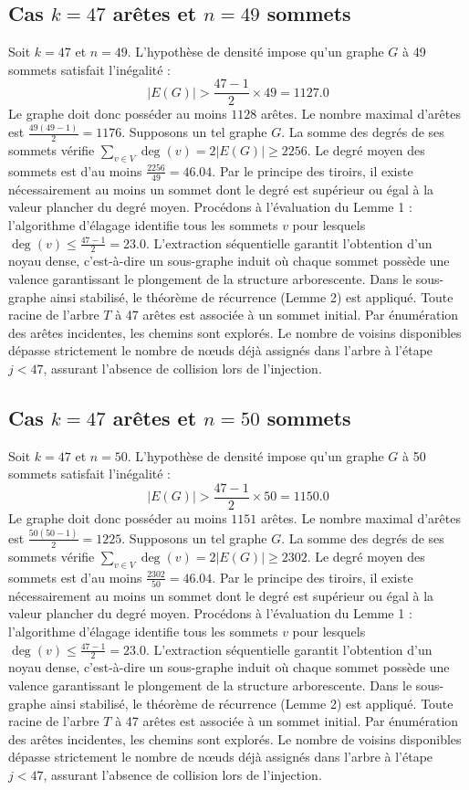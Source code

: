 \documentclass[12pt,a4paper]{article}
\begin{document}
\subsection{Cas $k = 47$ arêtes et $n = 49$ sommets}
Soit $k = 47$ et $n = 49$. L'hypothèse de densité impose qu'un graphe $G$ à 49 sommets satisfait l'inégalité :
$$ |E(G)| > \frac{47-1}{2} \times 49 = 1127.0 $$
Le graphe doit donc posséder au moins $1128$ arêtes. Le nombre maximal d'arêtes est $\frac{49(49-1)}{2} = 1176$.
Supposons un tel graphe $G$. La somme des degrés de ses sommets vérifie $\sum_{v \in V} \deg(v) = 2|E(G)| \geq 2256$.
Le degré moyen des sommets est d'au moins $\frac{2256}{49} = 46.04$.
Par le principe des tiroirs, il existe nécessairement au moins un sommet dont le degré est supérieur ou égal à la valeur plancher du degré moyen.
Procédons à l'évaluation du Lemme 1 : l'algorithme d'élagage identifie tous les sommets $v$ pour lesquels $\deg(v) \leq \frac{47-1}{2} = 23.0$.
L'extraction séquentielle garantit l'obtention d'un noyau dense, c'est-à-dire un sous-graphe induit où chaque sommet possède une valence garantissant le plongement de la structure arborescente.
Dans le sous-graphe ainsi stabilisé, le théorème de récurrence (Lemme 2) est appliqué. Toute racine de l'arbre $T$ à 47 arêtes est associée à un sommet initial. Par énumération des arêtes incidentes, les chemins sont explorés. Le nombre de voisins disponibles dépasse strictement le nombre de nœuds déjà assignés dans l'arbre à l'étape $j < 47$, assurant l'absence de collision lors de l'injection.

\subsection{Cas $k = 47$ arêtes et $n = 50$ sommets}
Soit $k = 47$ et $n = 50$. L'hypothèse de densité impose qu'un graphe $G$ à 50 sommets satisfait l'inégalité :
$$ |E(G)| > \frac{47-1}{2} \times 50 = 1150.0 $$
Le graphe doit donc posséder au moins $1151$ arêtes. Le nombre maximal d'arêtes est $\frac{50(50-1)}{2} = 1225$.
Supposons un tel graphe $G$. La somme des degrés de ses sommets vérifie $\sum_{v \in V} \deg(v) = 2|E(G)| \geq 2302$.
Le degré moyen des sommets est d'au moins $\frac{2302}{50} = 46.04$.
Par le principe des tiroirs, il existe nécessairement au moins un sommet dont le degré est supérieur ou égal à la valeur plancher du degré moyen.
Procédons à l'évaluation du Lemme 1 : l'algorithme d'élagage identifie tous les sommets $v$ pour lesquels $\deg(v) \leq \frac{47-1}{2} = 23.0$.
L'extraction séquentielle garantit l'obtention d'un noyau dense, c'est-à-dire un sous-graphe induit où chaque sommet possède une valence garantissant le plongement de la structure arborescente.
Dans le sous-graphe ainsi stabilisé, le théorème de récurrence (Lemme 2) est appliqué. Toute racine de l'arbre $T$ à 47 arêtes est associée à un sommet initial. Par énumération des arêtes incidentes, les chemins sont explorés. Le nombre de voisins disponibles dépasse strictement le nombre de nœuds déjà assignés dans l'arbre à l'étape $j < 47$, assurant l'absence de collision lors de l'injection.
\end{document}
